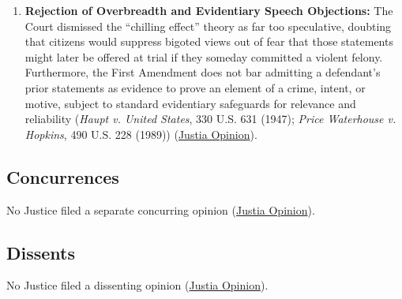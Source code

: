 \documentclass[12pt]{article}
\begin{document}
\begin{enumerate}
    \item \textbf{Rejection of Overbreadth and Evidentiary Speech Objections:} The Court dismissed the ``chilling effect'' theory as far too speculative, doubting that citizens would suppress bigoted views out of fear that those statements might later be offered at trial if they someday committed a violent felony. Furthermore, the First Amendment does not bar admitting a defendant's prior statements as evidence to prove an element of a crime, intent, or motive, subject to standard evidentiary safeguards for relevance and reliability (\textit{Haupt v. United States}, 330 U.S. 631 (1947); \textit{Price Waterhouse v. Hopkins}, 490 U.S. 228 (1989)) (\href{https://supreme.justia.com/cases/federal/us/508/476/}{Justia Opinion}).
\end{enumerate}

\subsection{Concurrences}
No Justice filed a separate concurring opinion (\href{https://supreme.justia.com/cases/federal/us/508/476/}{Justia Opinion}).

\subsection{Dissents}
No Justice filed a dissenting opinion (\href{https://supreme.justia.com/cases/federal/us/508/476/}{Justia Opinion}).
\end{document}
